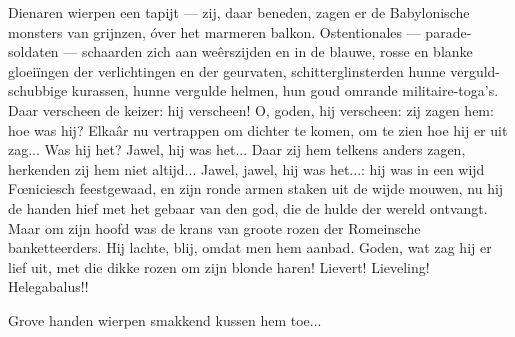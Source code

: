 \documentclass[a4paper, 12pt, oneside, dutch]{article}
\begin{document}
Dienaren wierpen een tapijt --- zij, daar beneden, zagen er de Babylonische monsters van grijnzen, óver het marmeren balkon. Ostentionales --- parade-soldaten --- schaarden zich aan weêrszijden en in de blauwe, rosse en blanke gloeiïngen der verlichtingen en der geurvaten, schitterglinsterden hunne verguld-schubbige kurassen, hunne vergulde helmen, hun goud omrande militaire-toga's. Daar verscheen de keizer: hij verscheen! O, goden, hij verscheen: zij zagen hem: hoe was hij? Elkaâr nu vertrappen om dichter te komen, om te zien hoe hij er uit zag... Was hij het? Jawel, hij was het... Daar zij hem telkens anders zagen, herkenden zij hem niet altijd... Jawel, jawel, hij was het...: hij was in een wijd Fœniciesch feestgewaad, en zijn ronde armen staken uit de wijde mouwen, nu hij de handen hief met het gebaar van den god, die de hulde der wereld ontvangt. Maar om zijn hoofd was de krans van groote rozen der Romeinsche banketteerders. Hij lachte, blij, omdat men hem aanbad. Goden, wat zag hij er lief uit, met die dikke rozen om zijn blonde haren! Lievert! Lieveling! Helegabalus!!

Grove handen wierpen smakkend kussen hem toe...
\end{document}
